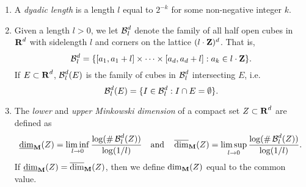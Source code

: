 \begin{enumerate}%
	\item A {\it dyadic length} is a length $l$ equal to $2^{-k}$ for some non-negative integer $k$.

	\item Given a length $l > 0$, we let $\operatorname{\mathcal{B}}^d_l$  denote the family of all half open cubes in $\operatorname{\mathbf{R}}^d$ with sidelength $l$ and corners on the lattice $(l \cdot \operatorname{\mathbf{Z}})^d$. That is,
	\[ \operatorname{\mathcal{B}}^d_l = \{ [a_1, a_1 + l] \times \cdots \times [a_d, a_d+l] : a_k \in l \cdot \operatorname{\mathbf{Z}} \}. \]
	If $E \subset \operatorname{\mathbf{R}}^d$, $\operatorname{\mathcal{B}}^d_l(E)$ is the family of cubes in $\operatorname{\mathcal{B}}^d_l$ intersecting $E$, i.e.
	\[ \operatorname{\mathcal{B}}^d_l(E) = \{ I \in \operatorname{\mathcal{B}}^d_l: I \cap E = \emptyset \}. \]

	\item The {\it lower} and {\it upper Minkowski dimension} of a compact set $Z \subset \operatorname{\mathbf{R}}^d$ are defined as
	\[		\operatorname{\underline{\dim}_{\mathbf{M}}}(Z) = \liminf_{l \to 0} \frac{\log(\# \operatorname{\mathcal{B}}^d_l(Z))}{\log(1/l)}\quad \text{and}\quad \operatorname{\overline{\dim}_{\mathbf{M}}}(Z) = \limsup_{l \to 0} \frac{\log(\# \operatorname{\mathcal{B}}^d_l(Z))}{\log(1/l)}. \]
	If $\operatorname{\underline{\dim}_{\mathbf{M}}}(Z) = \operatorname{\overline{\dim}_{\mathbf{M}}}(Z)$, then we define $\operatorname{\dim_{\mathbf{M}}}(Z)$ equal to the common value.


\end{enumerate}
